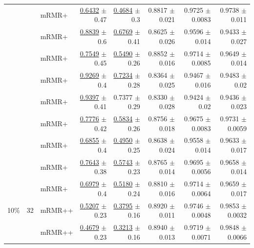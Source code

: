 \begin{longtable}{llp{}rrrrr}
 &  & mRMR+ & \underline{0.6432} {\scriptsize $\pm$ 0.47} & \underline{0.4684} {\scriptsize $\pm$ 0.3} & 0.8817 {\scriptsize $\pm$ 0.021} & 0.9725 {\scriptsize $\pm$ 0.0083} & 0.9738 {\scriptsize $\pm$ 0.011} \\
 &  & mRMR+ & \underline{0.8839} {\scriptsize $\pm$ 0.6} & \underline{0.6769} {\scriptsize $\pm$ 0.41} & 0.8625 {\scriptsize $\pm$ 0.026} & 0.9596 {\scriptsize $\pm$ 0.014} & 0.9433 {\scriptsize $\pm$ 0.027} \\
 &  & mRMR+ & \underline{0.7549} {\scriptsize $\pm$ 0.45} & \underline{0.5490} {\scriptsize $\pm$ 0.26} & 0.8852 {\scriptsize $\pm$ 0.016} & 0.9714 {\scriptsize $\pm$ 0.0085} & 0.9649 {\scriptsize $\pm$ 0.014} \\
 &  & mRMR+ & \underline{0.9269} {\scriptsize $\pm$ 0.4} & \underline{0.7234} {\scriptsize $\pm$ 0.28} & 0.8364 {\scriptsize $\pm$ 0.025} & 0.9467 {\scriptsize $\pm$ 0.016} & 0.9483 {\scriptsize $\pm$ 0.02} \\
 &  & mRMR+ & \underline{0.9397} {\scriptsize $\pm$ 0.41} & 0.7377 {\scriptsize $\pm$ 0.29} & 0.8330 {\scriptsize $\pm$ 0.028} & 0.9424 {\scriptsize $\pm$ 0.02} & 0.9436 {\scriptsize $\pm$ 0.023} \\
 &  & mRMR+ & \underline{0.7776} {\scriptsize $\pm$ 0.42} & \underline{0.5834} {\scriptsize $\pm$ 0.26} & 0.8756 {\scriptsize $\pm$ 0.018} & 0.9675 {\scriptsize $\pm$ 0.0083} & 0.9731 {\scriptsize $\pm$ 0.0059} \\
 &  & mRMR+ & \underline{0.6855} {\scriptsize $\pm$ 0.4} & \underline{0.4950} {\scriptsize $\pm$ 0.25} & 0.8638 {\scriptsize $\pm$ 0.024} & 0.9558 {\scriptsize $\pm$ 0.014} & 0.9633 {\scriptsize $\pm$ 0.017} \\
 &  & mRMR+ & \underline{0.7643} {\scriptsize $\pm$ 0.38} & \underline{0.5743} {\scriptsize $\pm$ 0.23} & 0.8765 {\scriptsize $\pm$ 0.014} & 0.9695 {\scriptsize $\pm$ 0.0056} & 0.9658 {\scriptsize $\pm$ 0.014} \\
 &  & mRMR+ & \underline{0.6979} {\scriptsize $\pm$ 0.4} & \underline{0.5180} {\scriptsize $\pm$ 0.24} & 0.8810 {\scriptsize $\pm$ 0.016} & 0.9714 {\scriptsize $\pm$ 0.0064} & 0.9659 {\scriptsize $\pm$ 0.017} \\
\midrule
10\% & 32 & mRMR++ & \underline{0.5207} {\scriptsize $\pm$ 0.23} & \underline{0.3795} {\scriptsize $\pm$ 0.16} & 0.8920 {\scriptsize $\pm$ 0.011} & 0.9746 {\scriptsize $\pm$ 0.0048} & 0.9853 {\scriptsize $\pm$ 0.0032} \\
 &  & mRMR++ & \underline{0.4679} {\scriptsize $\pm$ 0.23} & \underline{0.3213} {\scriptsize $\pm$ 0.16} & 0.8940 {\scriptsize $\pm$ 0.013} & 0.9719 {\scriptsize $\pm$ 0.0071} & 0.9848 {\scriptsize $\pm$ 0.0066} \\

\end{longtable}
